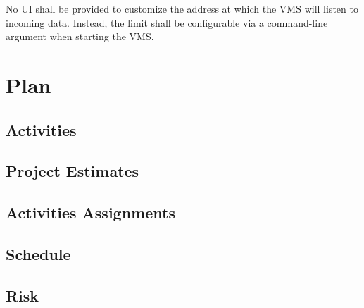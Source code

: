 \documentclass{article}
\begin{document}
No UI shall be provided to customize the address at which the VMS will listen to incoming data. Instead, the limit shall be configurable via a command-line argument when starting the VMS.

\section{Plan} %

\subsection{Activities}

\subsection{Project Estimates}

\subsection{Activities Assignments}

\subsection{Schedule}

\subsection{Risk}
\end{document}
